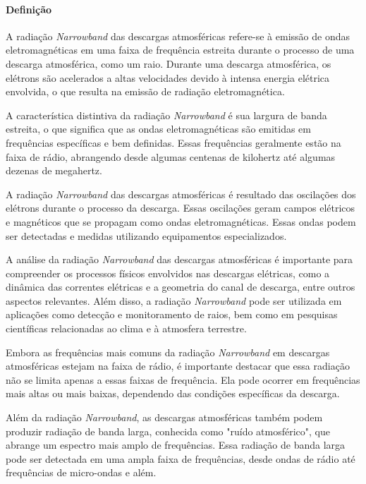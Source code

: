 \documentclass[a4paper, 12pt, onecolumn,singlespacing]{article}
\begin{document}
		\paragraph{Definição} A radiação \textit{Narrowband} das descargas atmosféricas refere-se à emissão de ondas eletromagnéticas em uma faixa de frequência estreita durante o processo de uma descarga atmosférica, como um raio. Durante uma descarga atmosférica, os elétrons são acelerados a altas velocidades devido à intensa energia elétrica envolvida, o que resulta na emissão de radiação eletromagnética.
		
		A característica distintiva da radiação \textit{Narrowband} é sua largura de banda estreita, o que significa que as ondas eletromagnéticas são emitidas em frequências específicas e bem definidas. Essas frequências geralmente estão na faixa de rádio, abrangendo desde algumas centenas de kilohertz até algumas dezenas de megahertz.
		
		A radiação \textit{Narrowband} das descargas atmosféricas é resultado das oscilações dos elétrons durante o processo da descarga. Essas oscilações geram campos elétricos e magnéticos que se propagam como ondas eletromagnéticas. Essas ondas podem ser detectadas e medidas utilizando equipamentos especializados.
		
		A análise da radiação \textit{Narrowband} das descargas atmosféricas é importante para compreender os processos físicos envolvidos nas descargas elétricas, como a dinâmica das correntes elétricas e a geometria do canal de descarga, entre outros aspectos relevantes. Além disso, a radiação \textit{Narrowband} pode ser utilizada em aplicações como detecção e monitoramento de raios, bem como em pesquisas científicas relacionadas ao clima e à atmosfera terrestre.
		
		Embora as frequências mais comuns da radiação \textit{Narrowband} em descargas atmosféricas estejam na faixa de rádio, é importante destacar que essa radiação não se limita apenas a essas faixas de frequência. Ela pode ocorrer em frequências mais altas ou mais baixas, dependendo das condições específicas da descarga.
		
		Além da radiação \textit{Narrowband}, as descargas atmosféricas também podem produzir radiação de banda larga, conhecida como "ruído atmosférico", que abrange um espectro mais amplo de frequências. Essa radiação de banda larga pode ser detectada em uma ampla faixa de frequências, desde ondas de rádio até frequências de micro-ondas e além.
		
\end{document}
